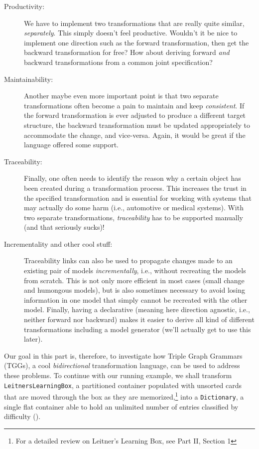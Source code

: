 \begin{description}
\item[Productivity:] We have to implement two transformations that are really quite similar, \emph{separately}. This simply doesn't feel productive.
Wouldn't it be nice to implement one direction such as the forward transformation, then get the backward transformation for free? How about deriving
forward \emph{and} backward transformations from a common joint specification?

\item[Maintainability:] Another maybe even more important point is that two separate transformations often become a pain to maintain and keep
\emph{consistent}. If the forward transformation is ever adjusted to produce a different target structure, the backward transformation must be updated
appropriately to accommodate the change, and vice-versa.  Again, it would be great if the language offered some support.

\item[Traceability:] Finally, one often needs to identify the reason why a certain object has been created during a transformation process. This increases the
trust in the specified transformation and is essential for working with systems that may actually do some harm (i.e., automotive or medical systems). With two
separate transformations, \emph{traceability} has to be supported manually (and that seriously sucks)! 

\item[Incrementality and other cool stuff:] Traceability links can also be used to propagate changes made to an existing pair of models \emph{incrementally}, i.e., without recreating the models from scratch. 
This is not only more efficient in most cases (small change and humongous models), but is also sometimes necessary to avoid losing information in one model that simply cannot be recreated with the other model.
Finally, having a declarative (meaning here direction agnostic, i.e., neither forward nor backward) makes it easier to derive all kind of different transformations including a model generator (we'll actually get to use this later).
\end{description}

Our goal in this part is, therefore, to investigate how Triple Graph Grammars (TGGs), a cool \emph{bidirectional} transformation language, can be used to address these problems. 
To continue with our running example, we shall transform \texttt{Leit\-ners\-Learn\-ing\-Box}, a partitioned container populated with unsorted cards that are moved through the box as they are memorized,\footnote{For a detailed review on Leitner's Learning Box, see Part II, Section 1} into a \texttt{Dictionary}, a single flat container able to hold an unlimited number of entries classified by difficulty ().

